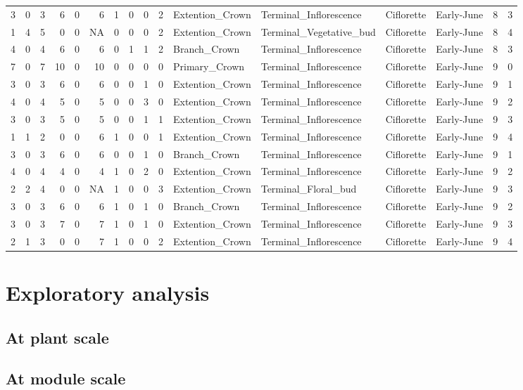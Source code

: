 \documentclass[]{article}
\begin{document}
\begin{longtable}[]{@{}rrrrrrrrrrllllrl@{}}
3 & 0 & 3 & 6 & 0 & 6 & 1 & 0 & 0 & 2 & Extention\_Crown &
Terminal\_Inflorescence & Ciflorette & Early-June & 8 & 3\tabularnewline
1 & 4 & 5 & 0 & 0 & NA & 0 & 0 & 0 & 2 & Extention\_Crown &
Terminal\_Vegetative\_bud & Ciflorette & Early-June & 8 &
4\tabularnewline
4 & 0 & 4 & 6 & 0 & 6 & 0 & 1 & 1 & 2 & Branch\_Crown &
Terminal\_Inflorescence & Ciflorette & Early-June & 8 & 3\tabularnewline
7 & 0 & 7 & 10 & 0 & 10 & 0 & 0 & 0 & 0 & Primary\_Crown &
Terminal\_Inflorescence & Ciflorette & Early-June & 9 & 0\tabularnewline
3 & 0 & 3 & 6 & 0 & 6 & 0 & 0 & 1 & 0 & Extention\_Crown &
Terminal\_Inflorescence & Ciflorette & Early-June & 9 & 1\tabularnewline
4 & 0 & 4 & 5 & 0 & 5 & 0 & 0 & 3 & 0 & Extention\_Crown &
Terminal\_Inflorescence & Ciflorette & Early-June & 9 & 2\tabularnewline
3 & 0 & 3 & 5 & 0 & 5 & 0 & 0 & 1 & 1 & Extention\_Crown &
Terminal\_Inflorescence & Ciflorette & Early-June & 9 & 3\tabularnewline
1 & 1 & 2 & 0 & 0 & 6 & 1 & 0 & 0 & 1 & Extention\_Crown &
Terminal\_Inflorescence & Ciflorette & Early-June & 9 & 4\tabularnewline
3 & 0 & 3 & 6 & 0 & 6 & 0 & 0 & 1 & 0 & Branch\_Crown &
Terminal\_Inflorescence & Ciflorette & Early-June & 9 & 1\tabularnewline
4 & 0 & 4 & 4 & 0 & 4 & 1 & 0 & 2 & 0 & Extention\_Crown &
Terminal\_Inflorescence & Ciflorette & Early-June & 9 & 2\tabularnewline
2 & 2 & 4 & 0 & 0 & NA & 1 & 0 & 0 & 3 & Extention\_Crown &
Terminal\_Floral\_bud & Ciflorette & Early-June & 9 & 3\tabularnewline
3 & 0 & 3 & 6 & 0 & 6 & 1 & 0 & 1 & 0 & Branch\_Crown &
Terminal\_Inflorescence & Ciflorette & Early-June & 9 & 2\tabularnewline
3 & 0 & 3 & 7 & 0 & 7 & 1 & 0 & 1 & 0 & Extention\_Crown &
Terminal\_Inflorescence & Ciflorette & Early-June & 9 & 3\tabularnewline
2 & 1 & 3 & 0 & 0 & 7 & 1 & 0 & 0 & 2 & Extention\_Crown &
Terminal\_Inflorescence & Ciflorette & Early-June & 9 & 4\tabularnewline
\bottomrule
\end{longtable}

\section{Exploratory analysis}\label{exploratory-analysis}

\subsection{At plant scale}\label{at-plant-scale}

\subsection{At module scale}\label{at-module-scale}
\end{document}
